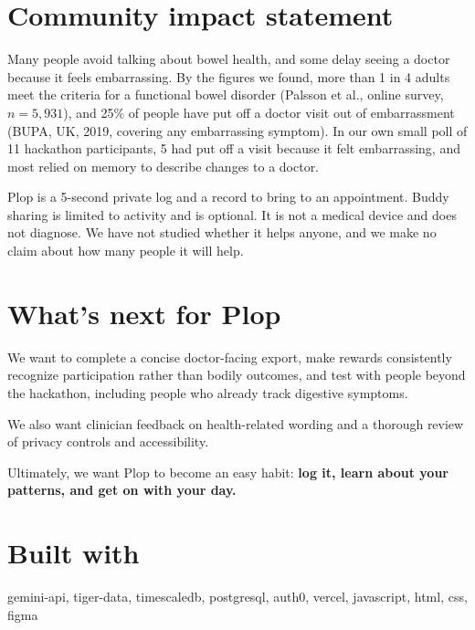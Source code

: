 \documentclass[11pt]{article}
\begin{document}
\section*{Community impact statement}

Many people avoid talking about bowel health, and some delay seeing a doctor because it feels embarrassing. By the figures we found, more than 1 in 4 adults meet the criteria for a functional bowel disorder (Palsson et al., online survey, $n = 5{,}931$), and 25\% of people have put off a doctor visit out of embarrassment (BUPA, UK, 2019, covering any embarrassing symptom). In our own small poll of 11 hackathon participants, 5 had put off a visit because it felt embarrassing, and most relied on memory to describe changes to a doctor.

Plop is a 5-second private log and a record to bring to an appointment. Buddy sharing is limited to activity and is optional. It is not a medical device and does not diagnose. We have not studied whether it helps anyone, and we make no claim about how many people it will help.

\section*{What's next for Plop}

We want to complete a concise doctor-facing export, make rewards consistently recognize participation rather than bodily outcomes, and test with people beyond the hackathon, including people who already track digestive symptoms.

We also want clinician feedback on health-related wording and a thorough review of privacy controls and accessibility.

Ultimately, we want Plop to become an easy habit: \textbf{log it, learn about your patterns, and get on with your day.}

\section*{Built with}

gemini-api, tiger-data, timescaledb, postgresql, auth0, vercel, javascript, html, css, figma
\end{document}

